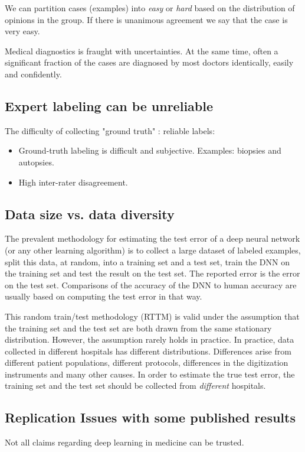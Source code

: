 \documentclass[fleqn,10pt]{wlscirep}
\begin{document}
We can partition cases (examples) into {\em easy} or {\em hard} based on the distribution of opinions in the group. If  there is unanimous agreement we say that the case is very easy. 


Medical diagnostics is fraught with uncertainties. At the same time, often a significant fraction of the cases are diagnosed by most doctors identically, easily and confidently.



\subsection*{Expert labeling can be unreliable \label{sec:UnreliableExperts}}
The difficulty of collecting "ground truth" : reliable labels:
\begin{itemize}
    \item Ground-truth labeling is difficult and subjective. Examples: biopsies and autopsies.
    \item High inter-rater disagreement.
\end{itemize}

\subsection*{Data size vs. data diversity}
The prevalent methodology for estimating the test error of a deep neural network (or any other learning algorithm) is to 
collect a large dataset of labeled examples, split this data, at random, into a training set and a test set, train the DNN on the training set and test the result on the test set. The reported error is the error on the test set. Comparisons of the accuracy of the DNN to human accuracy are usually based on computing the test error in that way.

This random train/test methodology (RTTM) is valid under the assumption that the training set and the test set are both drawn 
from the same stationary distribution. However, the assumption rarely holds in practice. In practice, data collected in different hospitals has different distributions. Differences arise from different patient populations, different protocols, differences in the digitization instruments and many other causes. In order to estimate the true test error, the training set and the test set should be collected from {\em different} hospitals.


\subsection*{Replication Issues with some published results}
Not all claims regarding deep learning in medicine can be trusted.
\end{document}
